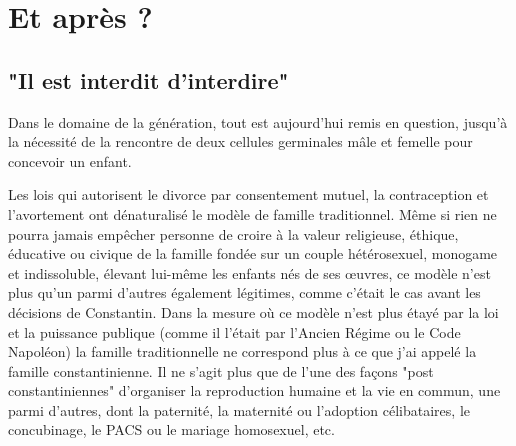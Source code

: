 

\part{Et après ?}

\chapter{"Il est interdit d'interdire"} 

  Dans le domaine de la génération, tout est aujourd'hui remis en question, jusqu'à la nécessité de la rencontre de deux cellules germinales mâle et femelle pour concevoir un enfant. 
  
  Les lois qui autorisent le divorce par consentement mutuel, la contraception et l'avortement ont dénaturalisé le modèle de famille traditionnel. Même si rien ne pourra jamais empêcher personne de croire à la valeur religieuse, éthique, éducative ou civique de la famille fondée sur un couple hétérosexuel, monogame et indissoluble, élevant lui-même les enfants nés de ses œuvres, ce modèle n'est plus qu'un parmi d'autres également légitimes, comme c'était le cas avant les décisions de Constantin. Dans la mesure où ce modèle n'est plus étayé par la loi et la puissance publique (comme il l'était par l'Ancien Régime ou le Code Napoléon) la famille traditionnelle ne correspond plus à ce que j'ai appelé la famille constantinienne. Il ne s’agit plus que de l'une des façons "post constantiniennes" d'organiser la reproduction humaine et la vie en commun, une parmi d'autres, dont la paternité, la maternité ou l'adoption célibataires, le concubinage, le PACS ou le mariage homosexuel, etc.
  
